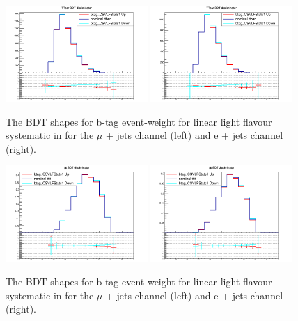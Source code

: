 \begin{figure}[ht!]
    \includegraphics[width=0.48\textwidth]{images/Run2/Sys/btag_CSVLFStats1systt.png}
    \includegraphics[width=0.48\textwidth]{images/Run2/Sys/btag_CSVLFStats1systt_e.png}     
    \caption{The BDT shapes for b-tag event-weight for linear light flavour systematic in \ttbar for the $\mu$ + jets channel (left) and e + jets channel (right).}
    \label{fig:SysShapesLStatstt1}
\end{figure}
\begin{figure}[ht!]
    \includegraphics[width=0.48\textwidth]{images/Run2/Sys/btag_CSVLFStats1systttt.png}
    \includegraphics[width=0.48\textwidth]{images/Run2/Sys/btag_CSVLFStats1systttt_e.png}     
    \caption{The BDT shapes for b-tag event-weight for linear light flavour systematic in \tttt for the $\mu$ + jets channel (left) and e + jets channel (right).}
    \label{fig:SysShapesLStatstttt1}
\end{figure}
